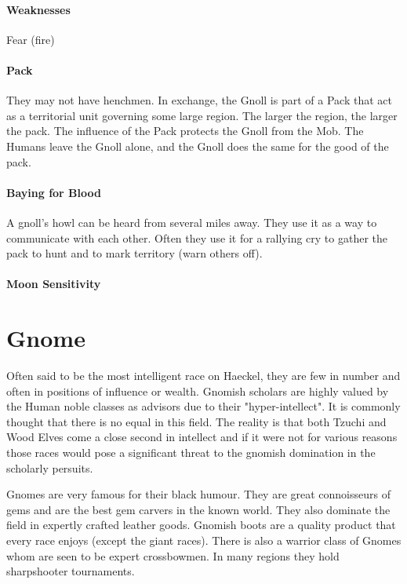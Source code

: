 \begin{multicols}{2}
    \paragraph{Weaknesses} Fear (fire)

\paragraph{Pack} They may not have henchmen. In exchange, the Gnoll is part of a Pack that act as a territorial unit governing some large region. The larger the region, the larger the pack. The influence of the Pack protects the Gnoll from the Mob. The Humans leave the Gnoll alone, and the Gnoll does the same for the good of the pack. 

\paragraph{Baying for Blood} A gnoll's howl can be heard from several miles away. They use it as a way to communicate with each other. Often they use it for a rallying cry to gather the pack to hunt and to mark territory (warn others off). 

\paragraph{Moon Sensitivity} 

\section{Gnome} Often said to be the most intelligent race on Haeckel, they are few in number and often in positions of influence or wealth. Gnomish scholars are highly valued by the Human noble classes as advisors due to their "hyper-intellect". It is commonly thought that there is no equal in this field. The reality is that both Tzuchi and Wood Elves come a close second in intellect and if it were not for various reasons those races would pose a significant threat to the gnomish domination in the scholarly persuits. 

Gnomes are very famous for their black humour. They are great connoisseurs of gems and are the best gem carvers in the known world. They also dominate the field in expertly crafted leather goods. Gnomish boots are a quality product that every race enjoys (except the giant races). There is also a warrior class of Gnomes whom are seen to be expert crossbowmen. In many regions they hold sharpshooter tournaments. 


\end{multicols}
